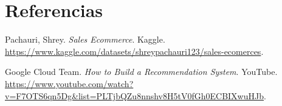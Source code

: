 \documentclass{llncs}
\begin{document}
\section{Referencias}
\begin{thebibliography}{99}
Pachauri, Shrey. \textit{Sales Ecommerce}. Kaggle. \url{https://www.kaggle.com/datasets/shreypachauri123/sales-ecomerces}.

Google Cloud Team. \textit{How to Build a Recommendation System}. YouTube. \url{https://www.youtube.com/watch?v=F7OTS6qn5Dg&list=PLTjbQZu8nnshv8H5tV0fGh0ECBIXwuHJb}.
\end{thebibliography}
\end{document}
